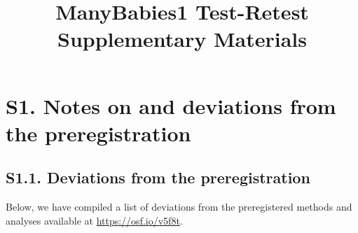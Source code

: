 \documentclass[
  man, donotrepeattitle,floatsintext]{apa6}
\title{ManyBabies1 Test-Retest Supplementary Materials}
\author{\phantom{0}}
\date{}
\affiliation{\phantom{0}}
\begin{document}
\maketitle

{
\setcounter{tocdepth}{3}
\tableofcontents
}
\newpage

\hypertarget{s1.-notes-on-and-deviations-from-the-preregistration}{%
\section{S1. Notes on and deviations from the preregistration}\label{s1.-notes-on-and-deviations-from-the-preregistration}}

\hypertarget{s1.1.-deviations-from-the-preregistration}{%
\subsection{S1.1. Deviations from the preregistration}\label{s1.1.-deviations-from-the-preregistration}}

Below, we have compiled a list of deviations from the preregistered methods and analyses available at \url{https://osf.io/v5f8t}.
\end{document}
